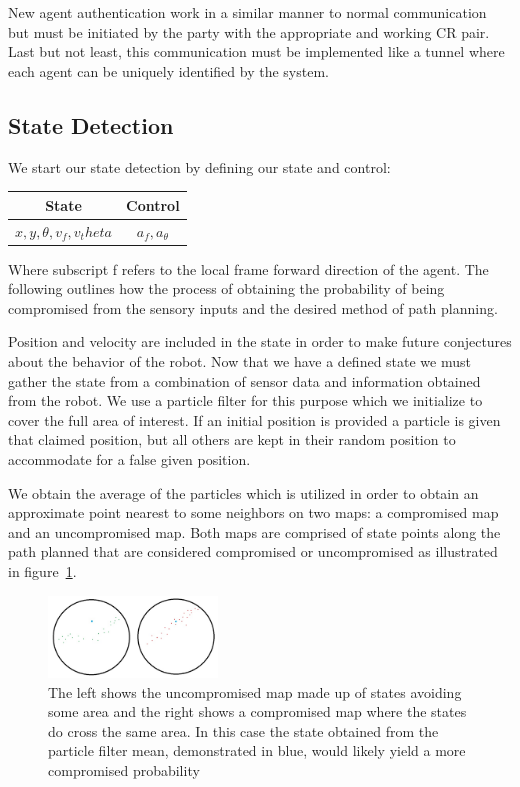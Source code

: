 \documentclass[conference]{IEEEtran}
\begin{document}
New agent authentication work in a similar manner to normal communication but must be initiated by the party with the appropriate and working CR pair. Last but not least, this communication must be implemented like a tunnel where each agent can be uniquely identified by the system.

\subsection{State Detection}

We start our state detection by defining our state and control:

\begin{table}[h]
\label{table_example}
\begin{center}
\begin{tabular}{|c|c|}
\hline
State & Control\\
\hline
$x,y,\theta,v_f,v_theta$ & $a_f,a_\theta$\\
\hline
\end{tabular}
\end{center}
\end{table}

Where subscript f refers to the local frame forward direction of the agent. The following outlines how the process of obtaining the probability of being compromised from the sensory inputs and the desired method of path planning.

Position and velocity are included in the state in order to make future conjectures about the behavior of the robot. Now that we have a defined state we must gather the state from a combination of sensor data and information obtained from the robot. We use a particle filter for this purpose which we initialize to cover the full area of interest. If an initial position is provided a particle is given that claimed position, but all others are kept in their random position to accommodate for a false given position.
	
We obtain the average of the particles  which is utilized in order to obtain an approximate point nearest to some neighbors on two maps: a compromised map and an uncompromised map. Both maps are comprised of state points along the path planned that are considered compromised or uncompromised as illustrated in figure~\ref{fig:compmaps}.
	
\begin{figure}[h]
\centering
\includegraphics[width=0.4\textwidth]{Path_comp_uncomp}
\caption{The left shows the uncompromised map made up of states avoiding some area and the right shows a compromised map where the states do cross the same area. In this case the state obtained from the particle filter mean, demonstrated in blue, would likely yield a more compromised probability}
\label{fig:compmaps}
\end{figure}
	
\end{document}
